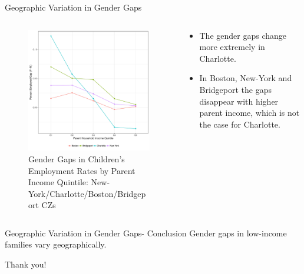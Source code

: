 \documentclass{beamer}
\begin{document}
\begin{frame}{Geographic Variation in Gender Gaps}
\begin{columns}
	
	\begin{column}{0.52\textwidth}
		\vspace{\topsep}
		\begin{figure}
			\vspace{-0.5cm}	
			\includegraphics[width=\columnwidth]{../fig_ys.pdf}
			\caption{{\scriptsize Gender Gaps in Children’s Employment Rates by Parent Income Quintile:
					New-York/Charlotte/Boston/Bridgeport CZs}}
		\end{figure}	
	\end{column}
	
	\begin{column}{0.4\textwidth}
		\vspace{-2.5cm}	
		\begin{itemize}
			\item The gender gaps change more extremely in Charlotte. 
			\item In Boston, New-York and Bridgeport the gaps disappear with higher parent income, which is not the case for Charlotte.
		\end{itemize}
	\end{column}
	
\end{columns}
\end{frame}

\begin{frame}{Geographic Variation in Gender Gaps- Conclusion}
Gender gaps in low-income families vary geographically.
\end{frame}


\begin{frame}
\begin{center}
\huge{Thank you!}
\end{center}
\end{frame}
\end{document}

